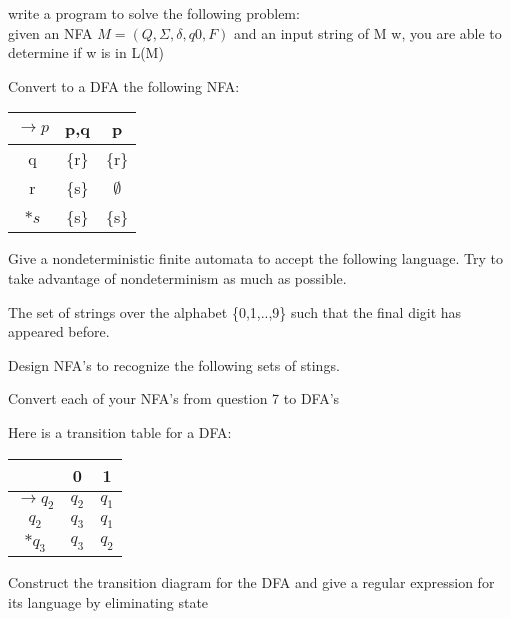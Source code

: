 \documentclass{exam}
\begin{document}
\begin{questions}
  \question
  write a program to solve the following problem:\\
  given an NFA $M = (Q, \Sigma, \delta, q0, F)$ and an input string of
  M w, you are able to determine if w is in L(M)

  \question
  Convert to a DFA the following NFA:
  \begin{center}
    \begin{tabular}{c|c|c}
      $\rightarrow p$&{p,q}&{p}\\
      \hline
      q&\{r\}&\{r\}\\
      r&\{s\}&$\emptyset$\\
      $*s$&\{s\}&\{s\}
    \end{tabular}
  \end{center}

  \question
  Give a nondeterministic finite automata to accept the following
  language. Try to take advantage of nondeterminism as much as possible.
  \begin{center}
    The set of strings over the alphabet \{0,1,..,9\} such that the final
    digit has appeared before.
  \end{center}

  \question
  Design NFA's to recognize the following sets of stings.

  \question
  Convert each of your NFA's from question 7 to DFA's

  \question
  Here is a transition table for a DFA:
  \begin{center}
    \begin{tabular}{c|c|c}
      &0&1\\
      \hline
      $\rightarrow q_2$&$q_2$&$q_1$\\
      $q_2$&$q_3$&$q_1$\\
      $*q_3$&$q_3$&$q_2$
    \end{tabular}
  \end{center}
  Construct the transition diagram for the DFA and give a regular
  expression for its language by eliminating state


\end{questions}
\end{document}
